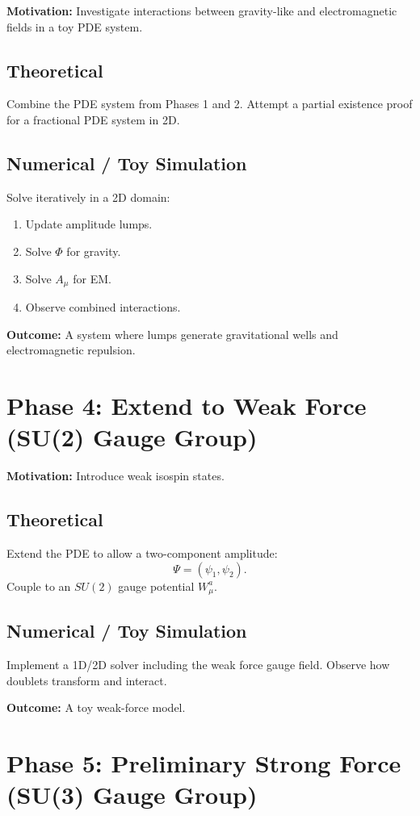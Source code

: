\documentclass{article}
\begin{document}
\textbf{Motivation:} Investigate interactions between gravity-like and electromagnetic fields in a toy PDE system.

\subsection{Theoretical}
Combine the PDE system from Phases 1 and 2.
Attempt a partial existence proof for a fractional PDE system in 2D.

\subsection{Numerical / Toy Simulation}
Solve iteratively in a 2D domain:
\begin{enumerate}
    \item Update amplitude lumps.
    \item Solve $\Phi$ for gravity.
    \item Solve $A_\mu$ for EM.
    \item Observe combined interactions.
\end{enumerate}

\textbf{Outcome:} A system where lumps generate gravitational wells and electromagnetic repulsion.

\section{Phase 4: Extend to Weak Force (SU(2) Gauge Group)}

\textbf{Motivation:} Introduce weak isospin states.

\subsection{Theoretical}
Extend the PDE to allow a two-component amplitude:
\begin{equation}
    \Psi = (\psi_1, \psi_2).
\end{equation}
Couple to an $SU(2)$ gauge potential $W_\mu^a$.

\subsection{Numerical / Toy Simulation}
Implement a 1D/2D solver including the weak force gauge field.
Observe how doublets transform and interact.

\textbf{Outcome:} A toy weak-force model.

\section{Phase 5: Preliminary Strong Force (SU(3) Gauge Group)}
\end{document}
